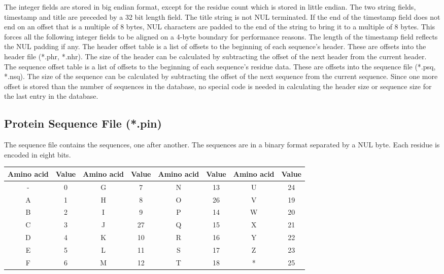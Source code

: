 The integer fields 
are stored in big endian format, except for the residue count which is 
stored in little endian.  The two string fields, timestamp and title 
are preceded by a 32 bit length field.  The title string is not NUL 
terminated.  If the end of the timestamp field does not end on an offset 
that is a multiple of 8 bytes, NUL characters are padded to the end of 
the string to bring it to a multiple of 8 bytes.  This forces all the 
following integer fields to be aligned on a 4-byte boundary for 
performance reasons.  The length of the timestamp field reflects the 
NUL padding if any.  The header offset table is a list of offsets to
the beginning of each sequence's header.  These are offsets into
the header file (*.phr, *.nhr).  The size of the header can be 
calculated by subtracting the offset of the next header from the 
current header.  
The sequence offset table is a list of offsets to
the beginning of each sequence's residue data.  These are offsets into
the sequence file (*.psq, *.nsq).  The size of the sequence can be 
calculated by subtracting the offset of the next sequence from the 
current sequence.  
Since one more offset is stored than the number 
of sequences in the database, no special code is needed in calculating 
the header size or sequence size for the last entry in the database.


\subsection{Protein Sequence File (*.pin)}

The sequence file contains the sequences, one after another.  The 
sequences are in a binary format separated by a NUL byte.  Each 
residue is encoded in eight bits.

\bigskip
\begin{center}
\begin{tabular}{|c|c|c|c|c|c|c|c|} \hline
Amino acid & Value & Amino acid & Value & Amino acid & Value & Amino acid & Value \\ \hline
- & 0 & G &  7 & N & 13 & U & 24 \\ \hline
A & 1 & H &  8 & O & 26 & V & 19 \\ \hline
B & 2 & I &  9 & P & 14 & W & 20 \\ \hline
C & 3 & J & 27 & Q & 15 & X & 21 \\ \hline
D & 4 & K & 10 & R & 16 & Y & 22 \\ \hline
E & 5 & L & 11 & S & 17 & Z & 23 \\ \hline
F & 6 & M & 12 & T & 18 & * & 25 \\ \hline
\end{tabular}
\end{center}


